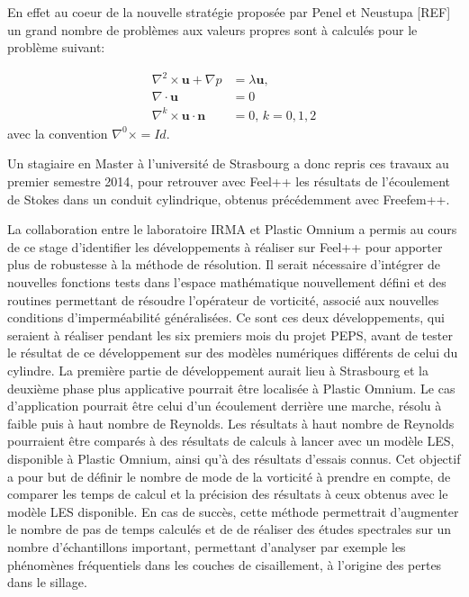 \documentclass{article}
\begin{document}
En effet au coeur de la nouvelle stratégie proposée par Penel et Neustupa [REF]
un grand nombre de problèmes aux valeurs propres sont à calculés pour le
problème suivant:

\begin{align}
  \label{eq:1}
  \nabla^2 \times \mathbf{u} + \nabla p &= \lambda \mathbf{u},\\
  \nabla \cdot \mathbf{u} &= 0\\
  \nabla^k\times \mathbf{u} \cdot \mathbf{n} &= 0,\, k=0,1,2
\end{align}
avec la convention $\nabla^0\times = Id$.

Un stagiaire en Master à l’université de Strasbourg a donc repris ces travaux au
premier semestre 2014, pour retrouver avec Feel++ les résultats de l’écoulement
de Stokes dans un conduit cylindrique, obtenus précédemment avec Freefem++.

La collaboration entre le laboratoire IRMA et Plastic Omnium a permis au cours
de ce stage d’identifier les développements à réaliser sur Feel++ pour apporter
plus de robustesse à la méthode de résolution. Il serait nécessaire d’intégrer
de nouvelles fonctions tests dans l’espace mathématique nouvellement défini et
des routines permettant de résoudre l’opérateur de vorticité, associé aux
nouvelles conditions d’imperméabilité généralisées. Ce sont ces deux
développements, qui seraient à réaliser pendant les six premiers mois du projet
PEPS, avant de tester le résultat de ce développement sur des modèles numériques
différents de celui du cylindre. La première partie de développement aurait lieu
à Strasbourg et la deuxième phase plus applicative pourrait être localisée à
Plastic Omnium. Le cas d’application pourrait être celui d’un écoulement
derrière une marche, résolu à faible puis à haut nombre de Reynolds. Les
résultats à haut nombre de Reynolds pourraient être comparés à des résultats de
calculs à lancer avec un modèle LES, disponible à Plastic Omnium, ainsi qu’à des
résultats d’essais connus. Cet objectif a pour but de définir le nombre de mode
de la vorticité à prendre en compte, de comparer les temps de calcul et la
précision des résultats à ceux obtenus avec le modèle LES disponible. En cas de
succès, cette méthode permettrait d’augmenter le nombre de pas de temps calculés
et de de réaliser des études spectrales sur un nombre d’échantillons important,
permettant d’analyser par exemple les phénomènes fréquentiels dans les couches
de cisaillement, à l’origine des pertes dans le sillage.
\end{document}
